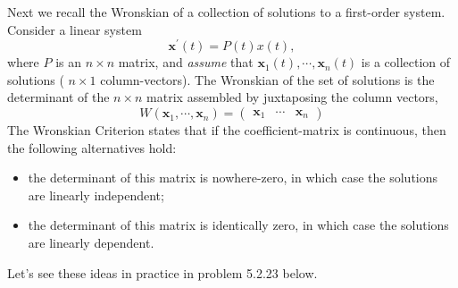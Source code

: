 \documentclass[11pt]{amsart}
\numberwithin{equation}{section}
\begin{document}
Next we recall the Wronskian of a collection of solutions to a first-order system. Consider a linear system
\begin{equation*}
\mathbf{x}^{'}(t)=P(t) x(t),
\end{equation*}
where $P$ is an $n \times n$ matrix, and \emph{assume} that $\mathbf{x}_1(t), \cdots, \mathbf{x}_n(t)$ is a collection of solutions ( $n \times 1$ column-vectors). The Wronskian of the set of solutions is the determinant of the $n \times n$ matrix assembled by juxtaposing the column vectors,
\begin{equation*}
W(\mathbf{x}_1, \cdots , \mathbf{x}_n) = \left(
\begin{matrix}
\mathbf{x}_1 & \cdots & \mathbf{x}_n
\end{matrix}
\right)
\end{equation*}
The Wronskian Criterion states that if the coefficient-matrix is continuous, then the following alternatives hold:
\begin{itemize}
\item the determinant of this matrix is nowhere-zero, in which case the solutions are linearly independent;
\item the determinant of this matrix is identically zero, in which case the solutions are linearly dependent. 
\end{itemize}
Let's see these ideas in practice in problem 5.2.23 below. 
\end{document}
